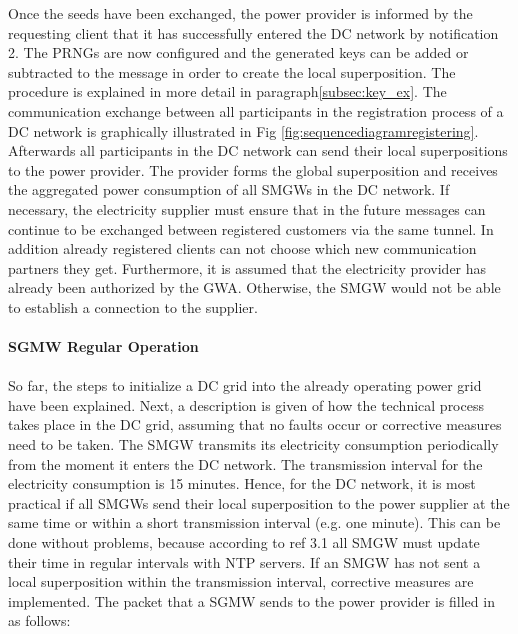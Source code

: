 Once the seeds have been exchanged, the power provider is informed by the requesting client that it has successfully entered the DC network by notification 2. The PRNGs are now configured and the generated keys can be added or subtracted to the message in order to create the local superposition. The procedure is explained in more detail in paragraph\ref{subsec:key_ex}.%
The communication exchange between all participants in the registration process of a DC network is graphically illustrated in Fig \ref{fig:sequencediagramregistering}. %
Afterwards all participants in the DC network can send their local superpositions to the power provider. The provider forms the global superposition and receives the aggregated power consumption of all SMGWs in the DC network. If necessary, the electricity supplier must ensure that in the future messages can continue to be exchanged between registered customers via the same tunnel. In addition already registered clients can not choose which new communication partners they get. Furthermore, it is assumed that the electricity provider has already been authorized by the GWA. Otherwise, the SMGW would not be able to establish a connection to the supplier.\\
\\
\textbf{SGMW Regular Operation}
\\
\\
So far, the steps to initialize a DC grid into the already operating power grid have been explained. Next, a description is given of how the technical process takes place in the DC grid, assuming that no faults occur or corrective measures need to be taken. The SMGW transmits its electricity consumption periodically from the moment it enters the DC network. The transmission interval for the electricity consumption is 15 minutes. Hence, for the DC network, it is most practical if all SMGWs send their local superposition to the power supplier at the same time or within a short transmission interval (e.g. one minute). This can be done without problems, because according to ref 3.1 all SMGW must update their time in regular intervals with NTP servers. If an SMGW has not sent a local superposition within the transmission interval, corrective measures are implemented. The packet that a SGMW sends to the power provider is filled in as follows:
